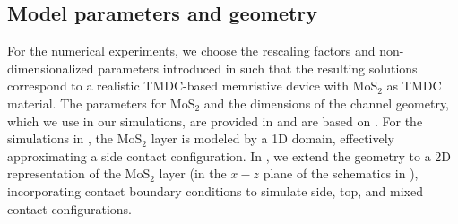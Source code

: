 \documentclass[10pt,a4paper, final]{article}
\theoremstyle{definition}								%
\numberwithin{equation}{section}
\numberwithin{figure}{section}
\numberwithin{theorem}{section}
\begin{document}
\subsection{Model parameters and geometry} \label{sec:params-geometry}
For the numerical experiments, we choose the rescaling factors and non-dimensionalized parameters introduced in  such that the resulting solutions correspond to a realistic TMDC-based memristive device with MoS$_2$ as TMDC material.
The parameters for MoS$_2$ and the dimensions of the channel geometry, which we use in our simulations, are provided in  and are based on \cite{Spetzler.2024}.
For the simulations in , the MoS$_2$ layer is modeled by a 1D domain, effectively approximating a side contact configuration.
In , we extend the geometry to a 2D representation of the MoS$_2$ layer (in the $x-z$ plane of the schematics in ), incorporating contact boundary conditions to simulate side, top, and mixed contact configurations.
\end{document}
